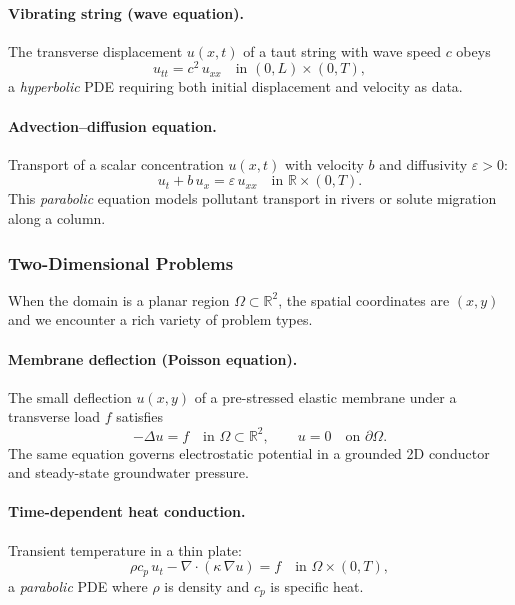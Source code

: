 \documentclass[11pt]{article}
\newcommand{\R}{\mathbb{R}}
\newcommand{\domain}{\Omega}
\newcommand{\boundary}{\partial\Omega}
\begin{document}
\paragraph{Vibrating string (wave equation).}
The transverse displacement $u(x,t)$ of a taut string with wave speed $c$
obeys
\begin{equation*}
  u_{tt} = c^2\,u_{xx} \quad \text{in } (0,L)\times(0,T),
\end{equation*}
a \emph{hyperbolic} PDE requiring both initial displacement and velocity as
data.

\paragraph{Advection--diffusion equation.}
Transport of a scalar concentration $u(x,t)$ with velocity $b$ and
diffusivity $\varepsilon > 0$:
\begin{equation*}
  u_t + b\,u_x = \varepsilon\,u_{xx} \quad \text{in } \R\times(0,T).
\end{equation*}
This \emph{parabolic} equation models pollutant transport in rivers or
solute migration along a column.

\subsubsection{Two-Dimensional Problems}

When the domain is a planar region $\domain \subset \R^2$, the spatial
coordinates are $(x,y)$ and we encounter a rich variety of problem types.

\paragraph{Membrane deflection (Poisson equation).}
The small deflection $u(x,y)$ of a pre-stressed elastic membrane under a
transverse load $f$ satisfies
\begin{equation*}
  -\Delta u = f \quad \text{in } \domain \subset \R^2,
  \qquad u = 0 \quad \text{on } \boundary.
\end{equation*}
The same equation governs electrostatic potential in a grounded 2D conductor
and steady-state groundwater pressure.

\paragraph{Time-dependent heat conduction.}
Transient temperature in a thin plate:
\begin{equation*}
  \rho c_p\,u_t - \nabla\cdot(\kappa\,\nabla u) = f
  \quad \text{in } \domain\times(0,T),
\end{equation*}
a \emph{parabolic} PDE where $\rho$ is density and $c_p$ is specific heat.
\end{document}
